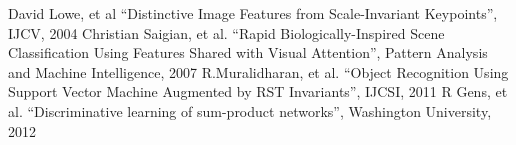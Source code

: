 \documentclass{article}
\begin{document}
    \begin{thebibliography}{9}
       David Lowe, et al “Distinctive Image Features from Scale-Invariant Keypoints”, IJCV, 2004
       Christian Saigian, et al. “Rapid Biologically-Inspired Scene Classification Using Features Shared with Visual Attention”, Pattern Analysis and Machine Intelligence, 2007
       R.Muralidharan, et al. “Object Recognition Using Support Vector Machine Augmented by RST Invariants”, IJCSI, 2011
       R Gens, et al. “Discriminative learning of sum-product networks”, Washington University, 2012
    \end{thebibliography}
\end{document}
